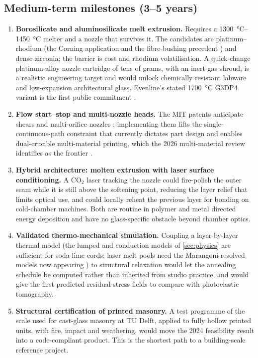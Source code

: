 \subsection{Medium-term milestones (3--5 years)}
\begin{enumerate}[leftmargin=*,itemsep=2pt]
  \item \textbf{Borosilicate and aluminosilicate melt extrusion.} Requires a \SIrange{1300}{1450}{\celsius} melter and a nozzle that survives it. The candidates are platinum--rhodium (the Corning application and the fibre-bushing precedent \citep{patent_corning2021,pgm2010}) and dense zirconia; the barrier is cost and rhodium volatilisation. A quick-change platinum-alloy nozzle cartridge of tens of grams, with an inert-gas shroud, is a realistic engineering target and would unlock chemically resistant labware and low-expansion architectural glass. Evenline's stated \SI{1700}{\celsius} G3DP4 variant is the first public commitment \citep{stern2024cgc}.
  \item \textbf{Flow start--stop and multi-nozzle heads.} The MIT patents anticipate shears and multi-orifice nozzles \citep{patent_us9919510}; implementing them lifts the single-continuous-path constraint that currently dictates part design \citep{mit2024masonry} and enables dual-crucible multi-material printing, which the 2026 multi-material review identifies as the frontier \citep{multimat2026}.
  \item \textbf{Hybrid architecture: molten extrusion with laser surface conditioning.} A CO$_2$ laser tracking the nozzle could fire-polish the outer seam while it is still above the softening point, reducing the layer relief that limits optical use, and could locally reheat the previous layer for bonding on cold-chamber machines. Both are routine in polymer and metal directed energy deposition and have no glass-specific obstacle beyond chamber optics.
  \item \textbf{Validated thermo-mechanical simulation.} Coupling a layer-by-layer thermal model (the lumped and conduction models of \cref{sec:physics} are sufficient for soda-lime cords; laser melt pools need the Marangoni-resolved models now appearing \citep{machines2026meltpool,lgd2021coaxial}) to structural relaxation would let the annealing schedule be computed rather than inherited from studio practice, and would give the first predicted residual-stress fields to compare with photoelastic tomography.
  \item \textbf{Structural certification of printed masonry.} A test programme of the scale used for cast-glass masonry at TU Delft, applied to fully hollow printed units, with fire, impact and weathering, would move the 2024 feasibility result \citep{mit2024masonry} into a code-compliant product. This is the shortest path to a building-scale reference project.
\end{enumerate}

